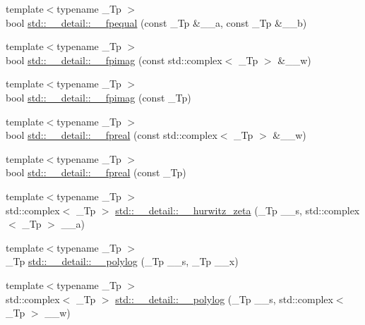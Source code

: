 \begin{DoxyCompactItemize}
\item 
{\footnotesize template$<$typename \+\_\+\+Tp $>$ }\\bool \hyperlink{namespacestd_1_1____detail_acefbc7637e41168e49d6230df9c5127f}{std\+::\+\_\+\+\_\+detail\+::\+\_\+\+\_\+fpequal} (const \+\_\+\+Tp \&\+\_\+\+\_\+a, const \+\_\+\+Tp \&\+\_\+\+\_\+b)
\item 
{\footnotesize template$<$typename \+\_\+\+Tp $>$ }\\bool \hyperlink{namespacestd_1_1____detail_a990a8fb06307793ceae4c3c288f8b876}{std\+::\+\_\+\+\_\+detail\+::\+\_\+\+\_\+fpimag} (const std\+::complex$<$ \+\_\+\+Tp $>$ \&\+\_\+\+\_\+w)
\item 
{\footnotesize template$<$typename \+\_\+\+Tp $>$ }\\bool \hyperlink{namespacestd_1_1____detail_a962bc8055b3948b6e2bebf34f86d9263}{std\+::\+\_\+\+\_\+detail\+::\+\_\+\+\_\+fpimag} (const \+\_\+\+Tp)
\item 
{\footnotesize template$<$typename \+\_\+\+Tp $>$ }\\bool \hyperlink{namespacestd_1_1____detail_ab78bb436e256ef9a3f64fa2a1ce25fb1}{std\+::\+\_\+\+\_\+detail\+::\+\_\+\+\_\+fpreal} (const std\+::complex$<$ \+\_\+\+Tp $>$ \&\+\_\+\+\_\+w)
\item 
{\footnotesize template$<$typename \+\_\+\+Tp $>$ }\\bool \hyperlink{namespacestd_1_1____detail_a52087623539a401ded28ef1ca8fbcd04}{std\+::\+\_\+\+\_\+detail\+::\+\_\+\+\_\+fpreal} (const \+\_\+\+Tp)
\item 
{\footnotesize template$<$typename \+\_\+\+Tp $>$ }\\std\+::complex$<$ \+\_\+\+Tp $>$ \hyperlink{namespacestd_1_1____detail_a7eb061915bad44dd29443b3476eaa7a0}{std\+::\+\_\+\+\_\+detail\+::\+\_\+\+\_\+hurwitz\+\_\+zeta} (\+\_\+\+Tp \+\_\+\+\_\+s, std\+::complex$<$ \+\_\+\+Tp $>$ \+\_\+\+\_\+a)
\item 
{\footnotesize template$<$typename \+\_\+\+Tp $>$ }\\\+\_\+\+Tp \hyperlink{namespacestd_1_1____detail_a17fb8cea11706f319aaea277188a29c8}{std\+::\+\_\+\+\_\+detail\+::\+\_\+\+\_\+polylog} (\+\_\+\+Tp \+\_\+\+\_\+s, \+\_\+\+Tp \+\_\+\+\_\+x)
\item 
{\footnotesize template$<$typename \+\_\+\+Tp $>$ }\\std\+::complex$<$ \+\_\+\+Tp $>$ \hyperlink{namespacestd_1_1____detail_aa14e3ca6e4bee5ac1f1e5e1c2cee1d5a}{std\+::\+\_\+\+\_\+detail\+::\+\_\+\+\_\+polylog} (\+\_\+\+Tp \+\_\+\+\_\+s, std\+::complex$<$ \+\_\+\+Tp $>$ \+\_\+\+\_\+w)

\end{DoxyCompactItemize}
